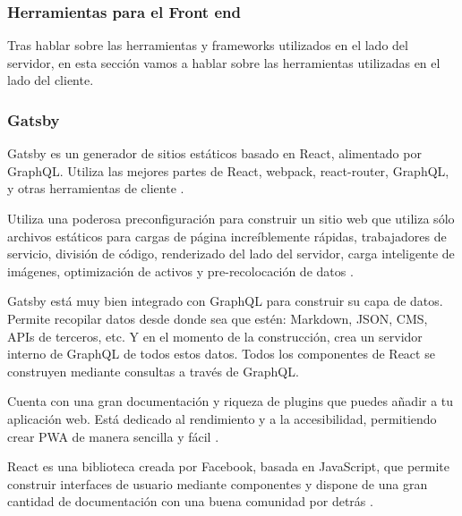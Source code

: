 \subsubsection{Herramientas para el Front end}

Tras hablar sobre las herramientas y frameworks utilizados en el lado del servidor, en esta sección vamos a hablar 
sobre las herramientas utilizadas en el lado del cliente.

\subsubsection*{Gatsby}

Gatsby es un generador de sitios estáticos basado en React, alimentado por GraphQL. Utiliza las mejores partes de 
React, webpack, react-router, GraphQL, y otras herramientas de cliente \cite{gatsby, what-is-gastby.js}.

\vspace{5mm}

\noindent Utiliza una poderosa preconfiguración para construir un sitio web que utiliza sólo archivos estáticos para 
cargas de página increíblemente rápidas, trabajadores de servicio, división de código, renderizado del lado del 
servidor, carga inteligente de imágenes, optimización de activos y pre-recolocación de datos 
\cite{what-is-gastby.js, why-gatsby}.

\vspace{5mm}

\noindent Gatsby está muy bien integrado con GraphQL para construir su capa de datos. Permite recopilar datos desde 
donde sea que estén: Markdown, JSON, CMS, APIs de terceros, etc. Y en el momento de la construcción, crea un servidor 
interno de GraphQL de todos estos datos. Todos los componentes de React se construyen mediante consultas a través de 
GraphQL.

\vspace{5mm}

\noindent Cuenta con una gran documentación y riqueza de plugins que puedes añadir a tu aplicación web. Está dedicado 
al rendimiento y a la accesibilidad, permitiendo crear PWA de manera sencilla y fácil \cite{why-gatsby}.

\vspace{5mm}

\noindent React es una biblioteca creada por Facebook, basada en JavaScript, que permite construir interfaces de 
usuario mediante componentes y dispone de una gran cantidad de documentación con una buena comunidad por detrás 
\cite{react}.

